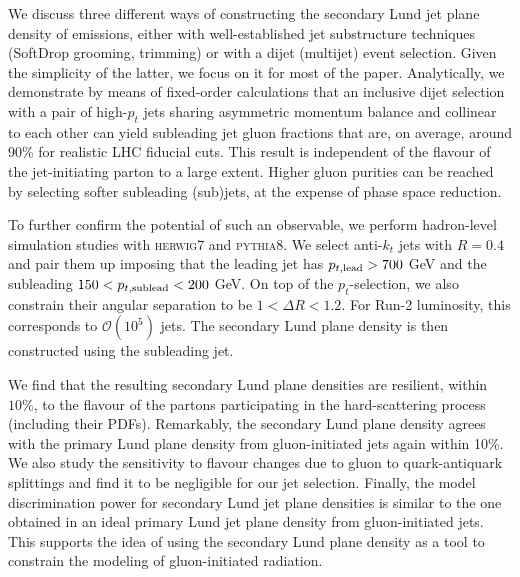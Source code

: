\documentclass[a4paper,11pt]{article}
\newcommand{\py}{{\textsc{pythia}}8\xspace}
\newcommand{\hw}{{\textsc{herwig}}7\xspace}
\begin{document}
We discuss three different ways of constructing the secondary Lund jet plane density of emissions, either with well-established jet substructure techniques (SoftDrop grooming, trimming) or with a dijet (multijet) event selection. Given the simplicity of the latter, we focus on it for most of the paper. Analytically, we demonstrate by means of fixed-order calculations that an inclusive dijet selection with a pair of high-$p_t$ jets sharing asymmetric momentum balance and collinear to each other can yield subleading jet gluon fractions that are, on average, around 90\% for realistic LHC fiducial cuts. This result is independent of the flavour of the jet-initiating parton to a large extent. Higher gluon purities can be reached by selecting softer subleading (sub)jets, at the expense of phase space reduction.

To further confirm the potential of such an observable, we perform hadron-level simulation studies with \hw and \py. We select anti-$k_t$ jets with $R=0.4$ and pair them up imposing that the leading jet has $p_{t,{\rm lead}}>700$ GeV and the subleading $150<p_{t,{\rm sublead}}<200$ GeV. On top of the $p_t$-selection, we also constrain their angular separation to be $1<\Delta R < 1.2$. For Run-2 luminosity, this corresponds to $\mathcal{O}(10^5)$ jets. The secondary Lund plane density is then constructed using the subleading jet. 

We find that the resulting secondary Lund plane densities are resilient, within $10\%$, to the flavour of the partons participating in the hard-scattering process (including their PDFs). Remarkably, the secondary Lund plane density agrees with the primary Lund plane density from gluon-initiated jets again within 10\%. We also study the sensitivity to flavour changes due to gluon to quark-antiquark splittings and find it to be negligible for our jet selection. Finally, the model discrimination power for secondary Lund jet plane densities is similar to the one obtained in an ideal primary Lund jet plane density from gluon-initiated jets. This supports the idea of using the secondary Lund plane density as a tool to constrain the modeling of gluon-initiated radiation.
\end{document}
